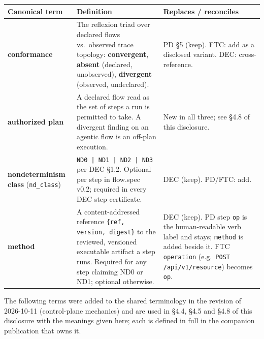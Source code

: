 \documentclass[11pt]{article}
\newcommand{\code}[1]{\texttt{#1}}
\begin{document}
\begin{center}
\footnotesize
\begin{tabular}{@{}p{2.7cm} p{7.1cm} p{5.6cm}@{}}
\toprule
\textbf{Canonical term} & \textbf{Definition} & \textbf{Replaces / reconciles} \\
\midrule
\textbf{conformance} & The reflexion triad over declared flows vs.\ observed trace topology: \textbf{convergent}, \textbf{absent} (declared, unobserved), \textbf{divergent} (observed, undeclared). & PD \S5 (keep). FTC: add as a disclosed variant. DEC: cross-reference. \\
\addlinespace
\textbf{authorized plan} & A declared flow read as the set of steps a run is permitted to take. A divergent finding on an agentic flow is an off-plan execution. & New in all three; see \S4.8 of this disclosure. \\
\addlinespace
\textbf{nondeterminism class} (\code{nd\_class}) & \code{ND0 | ND1 | ND2 | ND3} per DEC \S1.2. Optional per step in flow.spec v0.2; required in every DEC step certificate. & DEC (keep). PD/FTC: add. \\
\addlinespace
\textbf{method} & A content-addressed reference \code{\{ref, version, digest\}} to the reviewed, versioned executable artifact a step runs. Required for any step claiming ND0 or ND1; optional otherwise. & DEC (keep). PD step \code{op} is the human-readable verb label and stays; \code{method} is added beside it. FTC \code{operation} (e.g.\ \code{POST /api/v1/resource}) becomes \code{op}. \\
\bottomrule
\end{tabular}
\end{center}

The following terms were added to the shared terminology in the revision of 2026-10-11 (control-plane mechanics) and are used in \S4.4, \S4.5 and \S4.8 of this disclosure with the meanings given here; each is defined in full in the companion publication that owns it.
\end{document}
